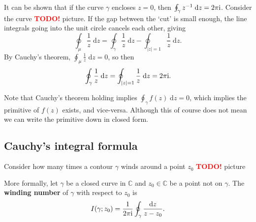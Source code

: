 \documentclass[letter-paper]{tufte-book}
\newcommand{\TODO}{\textcolor{red}{\bf TODO!}\xspace}
\newenvironment{example}[1][Example]{\begin{trivlist}
\item[\hskip \labelsep {\bfseries #1}]}{\end{trivlist}}
\newcommand{\zi}{{\rm i}}
\newcommand\Def[1]{\textbf{#1}}
\begin{document}
\begin{example}
  It can be shown that if the curve $\gamma$ encloses $z=0$, then $\oint_\gamma
  z^{-1}\; \mathrm{d}z = 2\pi \zi$. Consider the curve \TODO picture. If the gap
  between the `cut' is small enough, the line integrals going into the unit
  circle cancels each other, giving
  \begin{equation*}
    \oint_\mu \frac{1}{z}\; \mathrm{d}z = \oint_\gamma \frac{1}{z}\; \mathrm{d}z - \oint_{|z| = 1} \frac{1}{z}\; \mathrm{d}z.
  \end{equation*}
  By Cauchy's theorem, $\oint_\mu \frac{1}{z}\; \mathrm{d}z = 0$, so then
  \begin{equation*}
    \oint_\gamma \frac{1}{z}\; \mathrm{d}z = \oint_{|z| = 1} \frac{1}{z}\; \mathrm{d}z = 2\pi \zi.
  \end{equation*}
\end{example}

Note that Cauchy's theorem holding implies $\oint_\gamma f(z)\; \mathrm{d}z =
0$, which implies the primitive of $f(z)$ exists, and vice-versa. Although this
of course does not mean we can write the primitive down in closed form.


\subsection{Cauchy's integral formula}

Consider how many times a contour $\gamma$ winds around a point $z_0$ \TODO picture

More formally, let $\gamma$ be a closed curve in $\mathbb{C}$ and $z_0 \in
\mathbb{C}$ be a point not on $\gamma$. The \Def{winding number} of $\gamma$
with respect to $z_0$ is
\begin{equation}
  I(\gamma; z_0) = \frac{1}{2\pi\zi} \oint_\gamma \frac{\mathrm{d}z}{z - z_0}.
\end{equation}
\end{document}
